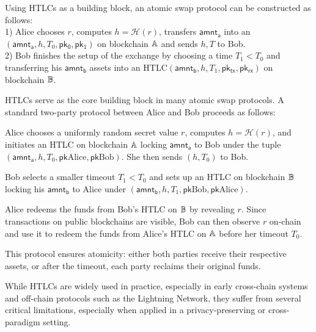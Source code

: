 Using HTLCs as a building block, an atomic swap protocol can be constructed as follows: \\
1) Alice chooses $r$, computes $h = \mathcal{H}(r)$, transfers $\mathsf{amnt_a}$ into an $(\mathsf{amnt_a}, h, T_0, \mathsf{pk_0}, \mathsf{pk_1})$ on blockchain $\mathbb{A}$ and sends $h,T$ to Bob. \\
2) Bob finishes the setup of the exchange by choosing a time $T_1 < T_0$ and transferring his $\mathsf{amnt_b}$ assets into an HTLC$(\mathsf{amnt_b}, h, T_1, \mathsf{pk_{tx}}, \mathsf{pk_{rx}})$ on blockchain $\mathbb{B}$.

HTLCs serve as the core building block in many atomic swap protocols. A standard two-party protocol between Alice and Bob proceeds as follows:

Alice chooses a uniformly random secret value $r$, computes $h = \mathcal{H}(r)$, and initiates an HTLC on blockchain $\mathbb{A}$ locking $\mathsf{amnt_a}$ to Bob under the tuple $(\mathsf{amnt_a}, h, T_0, \mathsf{pk}\text{Alice}, \mathsf{pk}\text{Bob})$. She then sends $(h, T_0)$ to Bob.

Bob selects a smaller timeout $T_1 < T_0$ and sets up an HTLC on blockchain $\mathbb{B}$ locking his $\mathsf{amnt_b}$ to Alice under $(\mathsf{amnt_b}, h, T_1, \mathsf{pk}\text{Bob}, \mathsf{pk}\text{Alice})$.

Alice redeems the funds from Bob’s HTLC on $\mathbb{B}$ by revealing $r$. Since transactions on public blockchains are visible, Bob can then observe $r$ on-chain and use it to redeem the funds from Alice’s HTLC on $\mathbb{A}$ before her timeout $T_0$.

This protocol ensures atomicity: either both parties receive their respective assets, or after the timeout, each party reclaims their original funds.

While HTLCs are widely used in practice, especially in early cross-chain systems and off-chain protocols such as the Lightning Network, they suffer from several critical limitations, especially when applied in a privacy-preserving or cross-paradigm setting.

